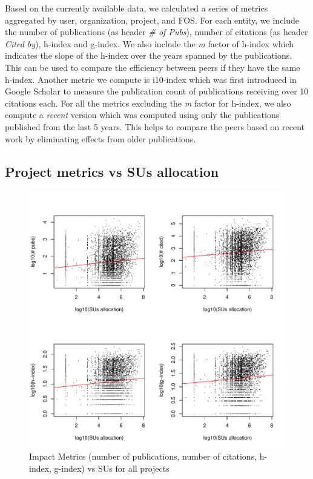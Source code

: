 \documentclass{sig-alternate}
\begin{document}
Based on the currently available data, we calculated a series of
metrics aggregated by user, organization, project, and FOS.  For each
entity, we include the number of publications (as header \emph{\# of
  Pubs}), number of citations (as header \emph{Cited by}), h-index and
g-index. We also include the \emph{m} factor of h-index which
indicates the slope of the h-index over the years spanned by the
publications. This can be used to compare the efficiency between
peers if they have the same h-index. Another metric we compute is
i10-index \cite{www-i10index} which was first introduced in Google
Scholar to measure the publication count of publications receiving
over 10 citations each. For all the metrics excluding the \emph{m}
factor for h-index, we also compute a \emph{recent} version which was
computed using only the publications published from the last 5
years. This helps to compare the peers based on recent work by
eliminating effects from older publications.

\subsection{Project metrics vs SUs allocation} 
 
\begin{figure}[!htb] 
  \centering 
    \includegraphics[width=1.0\columnwidth]{images/02_metrics_vs_alloc_proj.pdf} 
  \caption{Impact Metrics (number of publications, number of citations, h-index, g-index) vs SUs for all projects}\label{F:metrics-vs-alloc-proj} 
\end{figure} 
 
\end{document}
